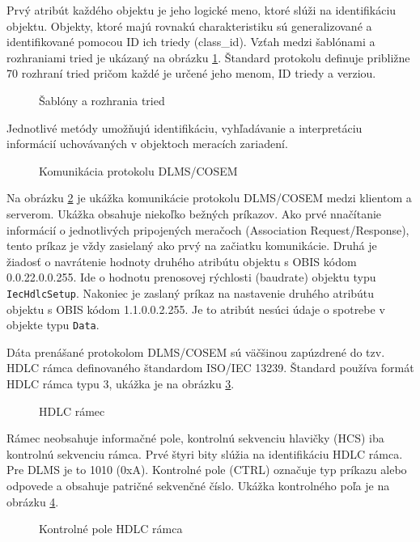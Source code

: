 Prvý atribút každého objektu je jeho logické meno, ktoré slúži na identifikáciu objektu. Objekty, ktoré majú rovnakú charakteristiku sú generalizované a identifikované pomocou ID ich triedy (class\_id). Vzťah medzi šablónami a rozhraniami tried je ukázaný na obrázku \ref{dlmsobject}. Štandard protokolu definuje približne 70 rozhraní tried pričom každé je určené jeho menom, ID triedy a verziou.
\begin{figure}[H]
    \centering
    \caption{Šablóny a rozhrania tried\cite{dlmscosem}}
\label{dlmsobject}
\end{figure}
Jednotlivé metódy umožňujú identifikáciu, vyhľadávanie a interpretáciu informácií uchovávaných v objektoch meracích zariadení\cite{dlmscosem}\cite{Horych}. \par
\begin{figure}[H]
    \centering
    \caption{Komunikácia protokolu DLMS/COSEM}
\label{dlmscom}
\end{figure}
Na obrázku \ref{dlmscom} je ukážka komunikácie protokolu DLMS/COSEM medzi klientom a serverom. Ukážka obsahuje niekoľko bežných príkazov. Ako prvé nnačítanie informácií o jednotlivých pripojených meračoch (Association Request/Response), tento príkaz je vždy zasielaný ako prvý na začiatku komunikácie. Druhá je žiadosť o navrátenie hodnoty druhého atribútu objektu s OBIS kódom 0.0.22.0.0.255. Ide o hodnotu prenosovej rýchlosti (baudrate) objektu typu {\tt IecHdlcSetup}. Nakoniec je zaslaný príkaz na nastavenie druhého atribútu objektu s OBIS kódom 1.1.0.0.2.255. Je to atribút nesúci údaje o spotrebe v objekte typu {\tt Data}. \par
Dáta prenášané protokolom DLMS/COSEM sú väčšinou zapúzdrené do tzv. HDLC rámca definovaného štandardom ISO/IEC 13239\cite{dlmscosem}. Štandard používa formát HDLC rámca typu 3, ukážka je na obrázku \ref{hdlc_frame}.
\begin{figure}[H]
    \centering
    \caption{HDLC rámec}
\label{hdlc_frame}
\end{figure} \par
Rámec neobsahuje informačné pole, kontrolnú sekvenciu hlavičky (HCS) iba kontrolnú sekvenciu rámca. Prvé štyri bity slúžia na identifikáciu HDLC rámca. Pre DLMS je to 1010 (0xA). Kontrolné pole (CTRL) označuje typ príkazu alebo odpovede a obsahuje patričné sekvenčné číslo. Ukážka kontrolného poľa je na obrázku \ref{ctrl}.
\begin{figure}[H]
    \centering
    \caption{Kontrolné pole HDLC rámca\cite{dlmscosem}}
\label{ctrl}
\end{figure} \par
